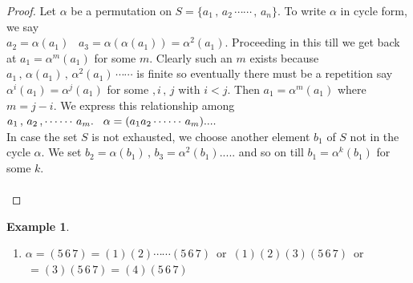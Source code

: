 \documentclass[11pt,a4paper]{article}
\theoremstyle{definition}
\newtheorem{exa}[thm]{Example}
\begin{document}
\begin{proof}
Let $\alpha$ be a permutation on $S = \{a_1\,, \, a_2\, \cdots\cdots\,, \, a_n\}$. To write $\alpha$ in cycle form, we say\\ $a_2 = \alpha(a_1)\,\,\,\,\, a_3 = \alpha(\alpha(a_1)) =\alpha^2(a_1)$. Proceeding in this till we get back at $a_1 = \alpha^m(a_1)$ for some $m$. Clearly such an $m$ exists because $a_1\, , \, \alpha(a_1)\, , \, \alpha^2(a_1)\, \cdots\cdots$ is finite so eventually there must be a repetition say $\alpha^i(a_1) = \alpha^j(a_1)$ for some $, i\, ,\, j$ with $i<j$. Then $a_1 = \alpha^m(a_1)$ where $m = j - i$. We express this relationship among $a_1\, , \, a_2\,, \cdots\cdots\, a_m.\hspace{0.3cm}\alpha = (a_1a_2\cdots\cdots\, a_m)....$ \\
In case the set $S$ is not exhausted, we choose another element $b_1$ of $S$ not in the cycle $\alpha$. We set $b_2 = \alpha(b_1)\, , \, b_3 = \alpha^2(b_1).....$ and so on till $b_1 = \alpha^k(b_1)$ for some $k$.\\\\
\end{proof}





\begin{exa}
\begin{enumerate}
\item $\alpha = (5\,6\,7) =(1)(2)\cdots\cdots (5\,6\,7)\,$ or $\,(1)(2)(3)(5\,6\,7)\,$ or $\, = (3)(5\,6\,7) = (4)(5\, 6\,7)$\\\\
\end{enumerate}
\end{exa}
\end{document}
